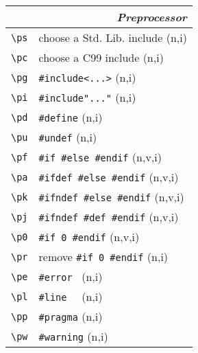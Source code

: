 \documentclass[oneside,11pt,landscape,DIV16]{scrartcl}
\begin{document}
\begin{multicols}{3}
\begin{center}
\begin{tabular}[]{|p{15mm}|p{55mm}|}
\hline
\hline
\multicolumn{2}{|r|}{\textsl{\textbf{P}reprocessor}}   \\
\hline \verb'\ps' & choose a Std. Lib. include    \hfill (n,i)  \\
\hline \verb'\pc' & choose a C99 include         \hfill (n,i)   \\
\hline \verb'\pg' & \verb$#include<...>$         \hfill (n,i)   \\
\hline \verb'\pi' & \verb$#include"..."$         \hfill (n,i)   \\
\hline \verb'\pd' & \verb'#define'               \hfill (n,i)   \\
\hline \verb'\pu' & \verb'#undef'                \hfill (n,i)   \\
\hline \verb'\pf' & \verb'#if #else #endif'      \hfill (n,v,i) \\
\hline \verb'\pa' & \verb'#ifdef #else #endif'   \hfill (n,v,i) \\
\hline \verb'\pk' & \verb'#ifndef #else #endif'  \hfill (n,v,i) \\
\hline \verb'\pj' & \verb'#ifndef #def #endif'   \hfill (n,v,i) \\
\hline \verb'\p0' & \verb'#if 0 #endif'          \hfill (n,v,i) \\
\hline \verb'\pr' & remove \verb'#if 0 #endif'   \hfill (n,i)   \\
\hline \verb'\pe' & \verb'#error '               \hfill (n,i)   \\
\hline \verb'\pl' & \verb'#line  '               \hfill (n,i)   \\
\hline \verb'\pp' & \verb'#pragma'               \hfill (n,i)   \\
\hline \verb'\pw' & \verb'#warning'              \hfill (n,i)   \\
\hline
\end{tabular} \\


\end{center}
\end{multicols}
\end{document}
